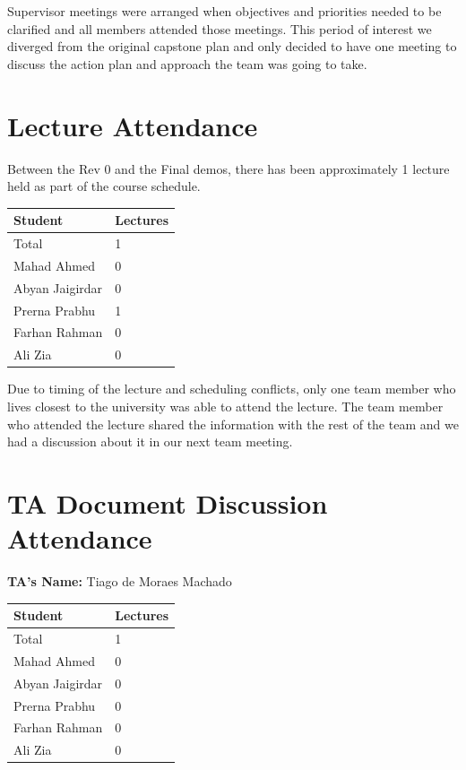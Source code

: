 \documentclass{article}
\begin{document}
\noindent
Supervisor meetings were arranged when objectives and priorities needed to be clarified and all members attended those meetings. This period of interest we diverged from the original capstone plan and only decided to have one meeting to discuss the action plan and approach the team was going to take. 

\section{Lecture Attendance}

Between the Rev 0 and the Final demos, there has been approximately 1 lecture held as part of the course schedule.


\begin{table}[H]
\centering
\begin{tabular}{ll}
\toprule
\textbf{Student} & \textbf{Lectures}\\
\midrule
Total & 1\\
Mahad Ahmed & 0\\
Abyan Jaigirdar & 0\\
Prerna Prabhu & 1\\
Farhan Rahman & 0\\
Ali Zia & 0\\
\bottomrule
\end{tabular}
\end{table}

Due to timing of the lecture and scheduling conflicts, only one team member who lives closest to the university was able to attend the lecture. The team member who attended the lecture shared the information with the rest of the team and we had a discussion about it in our next team meeting.

\section{TA Document Discussion Attendance}


\noindent \textbf{TA's Name: } Tiago de Moraes Machado

\begin{table}[H]
\centering
\begin{tabular}{ll}
\toprule
\textbf{Student} & \textbf{Lectures}\\
\midrule
Total & 1\\
Mahad Ahmed & 0\\
Abyan Jaigirdar & 0\\
Prerna Prabhu & 0\\
Farhan Rahman & 0\\
Ali Zia & 0\\
\bottomrule
\end{tabular}
\end{table}
\end{document}
